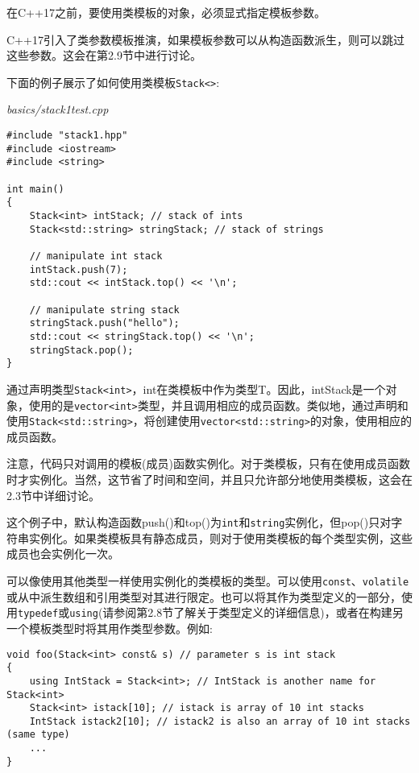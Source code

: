 在C++17之前，要使用类模板的对象，必须显式指定模板参数。

\begin{tcolorbox}[colback=webgreen!5!white,colframe=webgreen!75!black]
\hspace*{0.75cm}C++17引入了类参数模板推演，如果模板参数可以从构造函数派生，则可以跳过这些参数。这会在第2.9节中进行讨论。
\end{tcolorbox}

下面的例子展示了如何使用类模板\texttt{Stack<>}:

\noindent
\textit{basics/stack1test.cpp}
\begin{lstlisting}[style=styleCXX]
#include "stack1.hpp"
#include <iostream>
#include <string>

int main()
{
	Stack<int> intStack; // stack of ints
	Stack<std::string> stringStack; // stack of strings
	
	// manipulate int stack
	intStack.push(7);
	std::cout << intStack.top() << '\n';
	
	// manipulate string stack
	stringStack.push("hello");
	std::cout << stringStack.top() << '\n';
	stringStack.pop();
}
\end{lstlisting}

通过声明类型\texttt{Stack<int>}，int在类模板中作为类型T。因此，intStack是一个对象，使用的是\texttt{vector<int>}类型，并且调用相应的成员函数。类似地，通过声明和使用\texttt{Stack<std::string>}，将创建使用\texttt{vector<std::string>}的对象，使用相应的成员函数。

注意，代码只对调用的模板(成员)函数实例化。对于类模板，只有在使用成员函数时才实例化。当然，这节省了时间和空间，并且只允许部分地使用类模板，这会在2.3节中详细讨论。

这个例子中，默认构造函数push()和top()为\texttt{int}和\texttt{string}实例化，但pop()只对字符串实例化。如果类模板具有静态成员，则对于使用类模板的每个类型实例，这些成员也会实例化一次。

可以像使用其他类型一样使用实例化的类模板的类型。可以使用\texttt{const}、\texttt{volatile}或从中派生数组和引用类型对其进行限定。也可以将其作为类型定义的一部分，使用\texttt{typedef}或\texttt{using}(请参阅第2.8节了解关于类型定义的详细信息)，或者在构建另一个模板类型时将其用作类型参数。例如:

\begin{lstlisting}[style=styleCXX]
void foo(Stack<int> const& s) // parameter s is int stack
{
	using IntStack = Stack<int>; // IntStack is another name for Stack<int>
	Stack<int> istack[10]; // istack is array of 10 int stacks
	IntStack istack2[10]; // istack2 is also an array of 10 int stacks (same type)
	...
}
\end{lstlisting}

